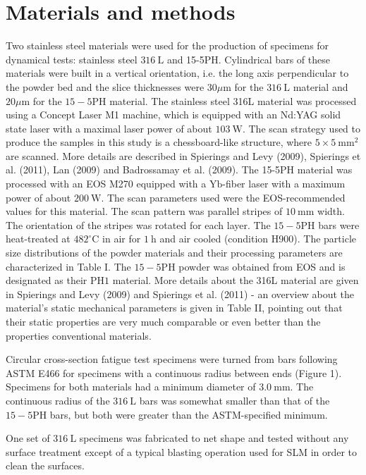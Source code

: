 \documentclass[10pt]{article}
\begin{document}
\section*{Materials and methods}
Two stainless steel materials were used for the production of specimens for dynamical tests: stainless steel $316 \mathrm{~L}$ and 15-5PH. Cylindrical bars of these materials were built in a vertical orientation, i.e. the long axis perpendicular to the powder bed and the slice thicknesses were $30 \mu \mathrm{m}$ for the $316 \mathrm{~L}$ material and $20 \mu \mathrm{m}$ for the $15-5 \mathrm{PH}$ material. The stainless steel 316L material was processed using a Concept Laser M1 machine, which is equipped with an Nd:YAG solid state laser with a maximal laser power of about $103 \mathrm{~W}$. The scan strategy used to produce the samples in this study is a chessboard-like structure, where $5 \times 5 \mathrm{~mm}^{2}$ are scanned. More details are described in Spierings and Levy (2009), Spierings et al. (2011), Lan (2009) and Badrossamay et al. (2009). The 15-5PH material was processed with an EOS M270 equipped with a $\mathrm{Yb}$-fiber laser with a maximum power of about $200 \mathrm{~W}$. The scan parameters used were the EOS-recommended values for this material. The scan pattern was parallel stripes of $10 \mathrm{~mm}$ width. The orientation of the stripes was rotated for each layer. The $15-5 \mathrm{PH}$ bars were heat-treated at $482^{\circ} \mathrm{C}$ in air for $1 \mathrm{~h}$ and air cooled (condition H900). The particle size distributions of the powder materials and their processing parameters are characterized in Table I. The $15-5 \mathrm{PH}$ powder was obtained from EOS and is designated as their $\mathrm{PH} 1$ material. More details about the 316L material are given in Spierings and Levy (2009) and Spierings et al. (2011) - an overview about the material's static mechanical parameters is given in Table II, pointing out that their static properties are very much comparable or even better than the properties conventional materials.

Circular cross-section fatigue test specimens were turned from bars following ASTM E466 for specimens with a continuous radius between ends (Figure 1). Specimens for both materials had a minimum diameter of $3.0 \mathrm{~mm}$. The continuous radius of the $316 \mathrm{~L}$ bars was somewhat smaller than that of the $15-5 \mathrm{PH}$ bars, but both were greater than the ASTM-specified minimum.

One set of $316 \mathrm{~L}$ specimens was fabricated to net shape and tested without any surface treatment except of a typical blasting operation used for SLM in order to clean the surfaces.
\end{document}
